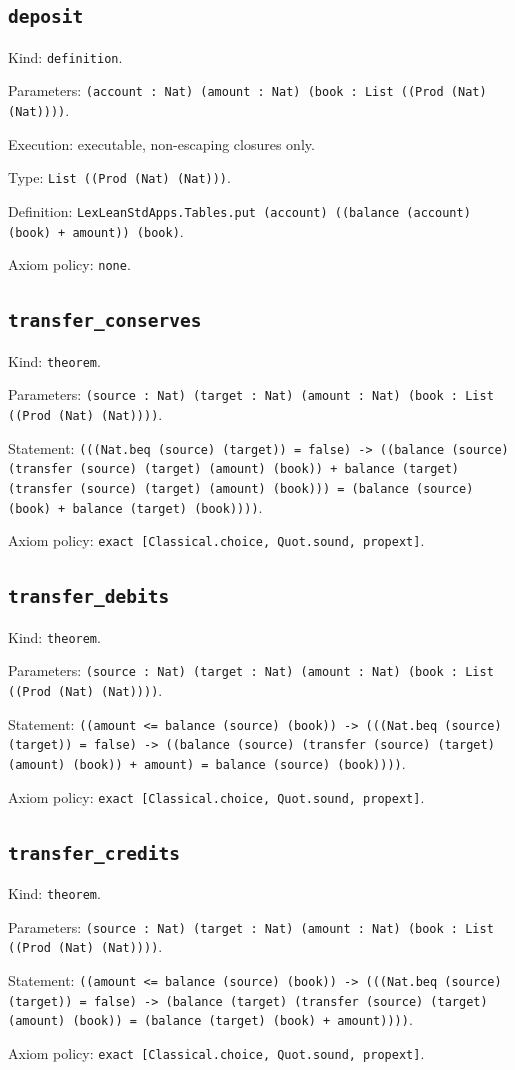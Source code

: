 \documentclass[11pt]{article}
\begin{document}
\subsection*{\texttt{deposit}}
\noindent Kind: \texttt{definition}.\par
\noindent Parameters: \texttt{(account : Nat) (amount : Nat) (book : List ((Prod (Nat) (Nat))))}.\par
\noindent Execution: executable, non-escaping closures only.\par
\noindent Type: \texttt{List ((Prod (Nat) (Nat)))}.\par
\noindent Definition: \texttt{LexLeanStdApps.Tables.put (account) ((balance (account) (book) + amount)) (book)}.\par
\noindent Axiom policy: \texttt{none}.\par
\subsection*{\texttt{transfer\_conserves}}
\noindent Kind: \texttt{theorem}.\par
\noindent Parameters: \texttt{(source : Nat) (target : Nat) (amount : Nat) (book : List ((Prod (Nat) (Nat))))}.\par
\noindent Statement: \texttt{(((Nat.beq (source) (target)) = false) -> ((balance (source) (transfer (source) (target) (amount) (book)) + balance (target) (transfer (source) (target) (amount) (book))) = (balance (source) (book) + balance (target) (book))))}.\par
\noindent Axiom policy: \texttt{exact [Classical.choice, Quot.sound, propext]}.\par
\subsection*{\texttt{transfer\_debits}}
\noindent Kind: \texttt{theorem}.\par
\noindent Parameters: \texttt{(source : Nat) (target : Nat) (amount : Nat) (book : List ((Prod (Nat) (Nat))))}.\par
\noindent Statement: \texttt{((amount <= balance (source) (book)) -> (((Nat.beq (source) (target)) = false) -> ((balance (source) (transfer (source) (target) (amount) (book)) + amount) = balance (source) (book))))}.\par
\noindent Axiom policy: \texttt{exact [Classical.choice, Quot.sound, propext]}.\par
\subsection*{\texttt{transfer\_credits}}
\noindent Kind: \texttt{theorem}.\par
\noindent Parameters: \texttt{(source : Nat) (target : Nat) (amount : Nat) (book : List ((Prod (Nat) (Nat))))}.\par
\noindent Statement: \texttt{((amount <= balance (source) (book)) -> (((Nat.beq (source) (target)) = false) -> (balance (target) (transfer (source) (target) (amount) (book)) = (balance (target) (book) + amount))))}.\par
\noindent Axiom policy: \texttt{exact [Classical.choice, Quot.sound, propext]}.\par
\end{document}
